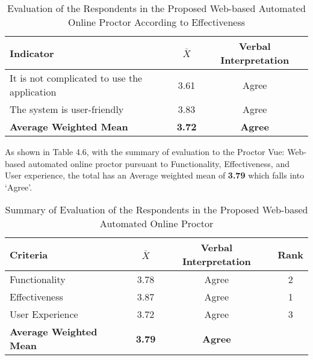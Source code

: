 \begin{table}[h!]
   \begin{center}
      \begin{tabular}{|m{20em}|c|c|}
         \hline
         \textbf{Indicator}                           & \textbf{$\bar{X}$} & \textbf{Verbal Interpretation} \\
         \hline
         It is not complicated to use the application & 3.61               & Agree                          \\
         \hline
         The system is user-friendly                  & 3.83               & Agree                          \\
         \hline
         \textbf{Average Weighted Mean}               & \textbf{3.72}      & \textbf{Agree}                 \\
         \hline
      \end{tabular}
   \end{center}
   \caption{Evaluation of the Respondents in the Proposed Web-based Automated Online Proctor According to Effectiveness}
\end{table}

As shown in Table 4.6, with the summary of evaluation to the Proctor Vue: Web-based automated online proctor pursuant to Functionality, Effectiveness, and User experience, the total has an Average weighted mean of \textbf{3.79} which falls into ‘Agree’.

\begin{table}[h!]
   \begin{center}
      \begin{tabular}{|m{12em}|c|c|c|}
         \hline
         \textbf{Criteria}              & \textbf{$\bar{X}$} & \textbf{Verbal Interpretation} & \textbf{Rank} \\
         \hline
         Functionality                  & 3.78               & Agree                          & 2             \\
         \hline
         Effectiveness                  & 3.87               & Agree                          & 1             \\
         \hline
         User Experience                & 3.72               & Agree                          & 3             \\
         \hline
         \textbf{Average Weighted Mean} & \textbf{3.79}      & \textbf{Agree}                 &               \\
         \hline
      \end{tabular}
   \end{center}
   \caption{Summary of Evaluation of the Respondents in the Proposed Web-based Automated Online Proctor}
\end{table}
